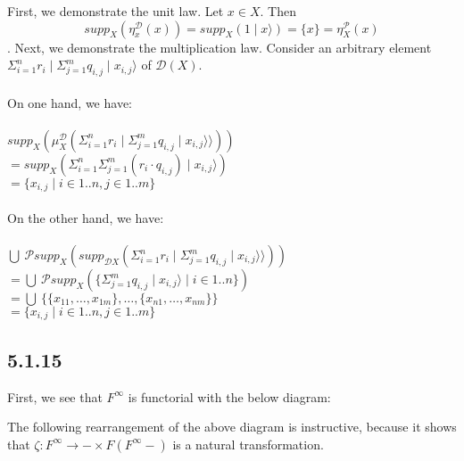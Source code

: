 \documentclass{article}
\begin{document}
First, we demonstrate the unit law. Let $x \in X$. Then 
$$\mathit{supp}_X(\eta_x^{\mathcal D}(x)) = \mathit{supp}_X(1 \mid x \rangle) = \{ x \} = \eta_{X}^{\mathcal P}(x)$$.
Next, we demonstrate the multiplication law. Consider an arbitrary element
$\Sigma_{i=1}^n r_i \mid \Sigma_{j=1}^m q_{i,j} \mid x_{i,j} \rangle$ of $\mathcal D(X)$.\\~\\
On one hand, we have:\\~\\
$\mathit{supp}_X(\mu^{\mathcal D}_X(\Sigma_{i=1}^n r_i \mid \Sigma_{j=1}^m q_{i,j} \mid x_{i,j} \rangle \rangle))$\\
$= \mathit{supp}_X (\Sigma_{i=1}^n \Sigma_{j=1}^m (r_i \cdot q_{i,j}) \mid x_{i,j} \rangle)$\\
$= \{ x_{i,j} \mid i \in 1..n, j \in 1..m \}$\\~\\
On the other hand, we have:\\~\\
$\bigcup~\mathcal P \mathit{supp}_{X}(\mathit{supp}_{\mathcal D X}(\Sigma_{i=1}^n r_i \mid \Sigma_{j=1}^m q_{i,j} \mid x_{i,j} \rangle \rangle))$\\
$= \bigcup~\mathcal P \mathit{supp}_{X}(\{ \Sigma_{j=1}^m q_{i,j} \mid x_{i,j} \rangle \mid i \in 1..n \})$\\
$= \bigcup~\{ \{x_{11},\ldots,x_{1m} \}, \ldots, \{ x_{n1}, \ldots, x_{nm} \} \}$\\
$= \{ x_{i,j} \mid i \in 1..n, j \in 1..m \}$ 
\subsection*{5.1.15}

First, we see that $F^{\infty}$ is functorial with the below diagram:

\begin{center}
\end{center} 

The following rearrangement of the above diagram is instructive, because it shows that 
$\zeta : F^{\infty} \to - \times F(F^\infty -)$ is a natural transformation.
\end{document}
